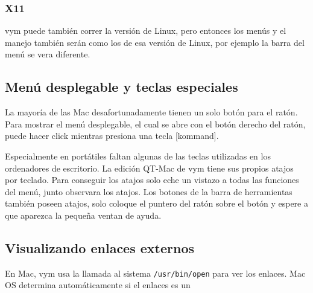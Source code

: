 \documentclass{article}
\newcommand{\vym}{{\sc vym }}
\newcommand{\key}[1]{[#1]}
\begin{document}
\subsubsection*{X11}
	\vym puede tambi\'en correr la versi\'on de Linux, pero entonces los men\'us y el manejo tambi\'en ser\'an como los de esa versi\'on de Linux, por ejemplo la barra del men\'u se vera diferente. 

\subsection	{Men\'u desplegable y teclas especiales}

La mayor\'ia de las Mac desafortunadamente tienen un solo bot\'on para el rat\'on. Para mostrar el men\'u desplegable, el cual se abre con el bot\'on derecho del rat\'on, puede hacer click mientras presiona una tecla \key{kommand}.

Especialmente en port\'atiles faltan algunas de las teclas utilizadas en los ordenadores de escritorio. La edici\'on QT-Mac de \vym tiene sus propios atajos por teclado. Para conseguir los atajos solo eche un vistazo a todas las funciones del men\'u, junto observara los atajos. Los botones de la barra de herramientas tambi\'en poseen atajos, solo coloque el puntero del rat\'on sobre el bot\'on y espere a que aparezca la peque\~na ventan de ayuda.

\subsection {Visualizando enlaces externos}

En Mac, \vym usa la llamada al sistema {\tt /usr/bin/open} para ver los enlaces. Mac OS determina autom\'aticamente si el enlaces es un 
\end{document}
